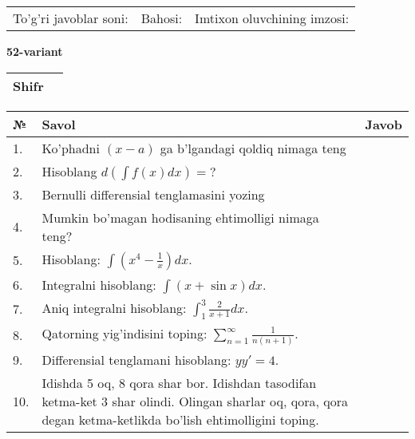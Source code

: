 \documentclass{article}
\begin{document}
  \vspace{1cm}
  
  \begin{tabular}{lll}
  To'g'ri javoblar soni: \underline{\hspace{1.5cm}} & 
  Bahosi: \underline{\hspace{1.5cm}} & 
  Imtixon oluvchining imzosi: \underline{\hspace{2cm}} \\
  \end{tabular}
  
  \egroup
  
  \newpage
  
  
  \textbf{52-variant}\\
  
  \bgroup
  \def\arraystretch{1.6} %
  
  \begin{tabular}{|m{5.7cm}|m{9.5cm}|}
  \hline
  Shifr & \\
  \hline
  \end{tabular}
  
  \vspace{1cm}
  
  \begin{tabular}{|m{0.7cm}|m{10cm}|m{4cm}|}
  \hline
  № & Savol & Javob \\
  \hline
  1. & Ko'phadni \((x - a)\) ga b'lgandagi qoldiq nimaga teng &  \\
  \hline
  2. & Hisoblang \(d\left( \int {f(x)dx} \right) = ?\) &  \\
  \hline
  3. & Bernulli differensial tenglamasini yozing &  \\
  \hline
  4. & Mumkin bo'magan hodisaning ehtimolligi nimaga teng? &  \\
  \hline
  5. & Hisoblang: \(\int \left( x^{4} - \frac{1}{x} \right)dx\). &  \\
  \hline
  6. & Integralni hisoblang: \(\int {(x + \sin x)dx}\). &  \\
  \hline
  7. & Aniq integralni hisoblang: \(\int_{1}^{3}\frac{2}{x + 1}dx\). &  \\
  \hline
  8. & Qatorning yig'indisini toping: \(\sum_{n = 1}^{\infty}\frac{1}{n(n + 1)}\). &  \\
  \hline
  9. & Differensial tenglamani hisoblang: \(yy' = 4\). &  \\
  \hline
  10. & Idishda 5 oq, 8 qora shar bor. Idishdan tasodifan ketma-ket 3 shar olindi. Olingan sharlar oq, qora, qora degan ketma-ketlikda bo'lish ehtimolligini toping. &  \\
  \hline
  \end{tabular}
  
\end{document}
